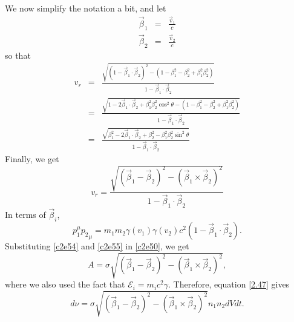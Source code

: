 \begin{enumerate}
We now simplify the notation a bit, and let
\begin{eqnarray}
\vec{\beta}_1 &=& \frac{\vec{v}_1}{c} \label{c2e52} \\
\vec{\beta}_2 &=& \frac{\vec{v}_2}{c} \label{c2e53}
\end{eqnarray}
so that
\begin{eqnarray*}
v_r &=& \frac{\sqrt{(1 - \vec{\beta}_1\cdot\vec{\beta}_2)^2 - (1 - \beta_1^2 - \beta_2^2 + \beta_1^2\beta_2^2)}}
{1 - \vec{\beta}_1\cdot\vec{\beta}_2} \\
 &=& \frac{\sqrt{1 - 2\vec{\beta}_1\cdot\vec{\beta}_2 + \beta_1^2\beta_2^2\cos^2\theta - 
 (1 - \beta_1^2 - \beta_2^2 + \beta_1^2\beta_2^2)}}{1 - \vec{\beta}_1\cdot\vec{\beta}_2} \\
 &=& \frac{\sqrt{\beta_1^2 - 2\vec{\beta}_1\cdot\vec{\beta}_2 + \beta_2^2 - \beta_1^2\beta_2^2\sin^2\theta }}
 {1 - \vec{\beta}_1\cdot\vec{\beta}_2}
\end{eqnarray*}
Finally, we get
\begin{equation}\label{c2e54}
v_r = \frac{\sqrt{(\vec{\beta}_1 - \vec{\beta}_2)^2 - (\vec{\beta}_1 \times \vec{\beta}_2)^2}}
  {1 - \vec{\beta}_1\cdot\vec{\beta}_2}
\end{equation}
In terms of $\vec{\beta}_i$,
\begin{equation}\label{c2e55}
p_1^\mu {p_2}_\mu = m_1m_2\gamma(v_1)\gamma(v_2)c^2\left(1 - \vec{\beta}_1\cdot\vec{\beta}_2\right).
\end{equation}
Substituting \eqref{c2e54} and \eqref{c2e55} in \eqref{c2e50}, we get
\begin{equation}\label{c2e56}
A = \sigma \sqrt{(\vec{\beta}_1 - \vec{\beta}_2)^2 - (\vec{\beta}_1 \times \vec{\beta}_2)^2},
\end{equation}
where we also used the fact that $\mathcal{E}_i = m_ic^2\gamma$. Therefore, equation \eqref{2.47} gives
\begin{equation}\label{c2e57}
d\nu = \sigma \sqrt{(\vec{\beta}_1 - \vec{\beta}_2)^2 - (\vec{\beta}_1 \times \vec{\beta}_2)^2}
	n_1n_2dVdt.
\end{equation}


\end{enumerate}
